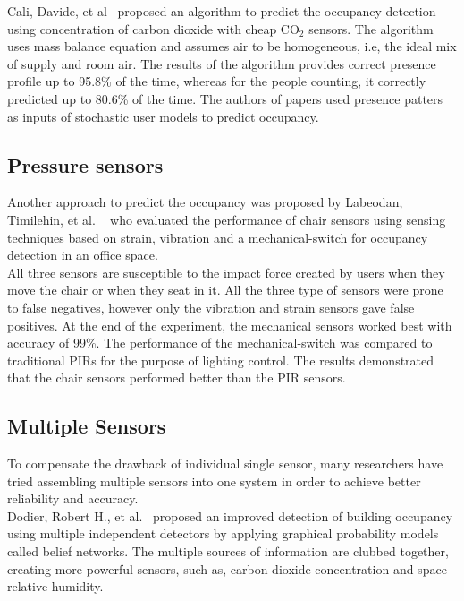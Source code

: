 Cali, Davide, et al~\cite{cali2015co2} proposed an algorithm to predict the occupancy detection using concentration of carbon dioxide with cheap CO$_{2}$ sensors. The algorithm uses mass balance equation and assumes air to be homogeneous, i.e, the ideal mix of supply and room air. The results of the algorithm provides correct presence profile up to 95.8\%  of the time, whereas for the people
counting, it correctly predicted up to 80.6\%  of the time. The authors of papers used presence patters as inputs of stochastic user models to predict occupancy. 


\subsection{Pressure sensors}
Another approach to predict the occupancy was proposed by Labeodan, Timilehin, et al. ~\cite{labeodan2016experimental} who evaluated the performance of chair sensors using sensing techniques based on strain, vibration and a mechanical-switch for occupancy detection in an office space.
\\
All three sensors are susceptible to the impact force created by users when they move the chair or when they seat in it. All the three type of sensors were prone to false negatives, however only the vibration and strain sensors gave false positives. At the end of the experiment, the mechanical sensors worked best with accuracy of 99\%. The performance of the mechanical-switch was compared to traditional PIRs for the purpose of lighting control. The results demonstrated that the chair sensors performed better than the PIR sensors.


\subsection{Multiple Sensors}

To compensate the drawback of individual single sensor, many researchers have tried assembling multiple sensors into one system in order to achieve better reliability and accuracy.
\\

Dodier, Robert H., et al.~\cite{dodier2006building} proposed an improved detection of building occupancy using multiple independent detectors by applying graphical probability models called belief networks. The multiple sources of information are clubbed together, creating more powerful sensors, such as, carbon dioxide concentration and space relative humidity.
\\



